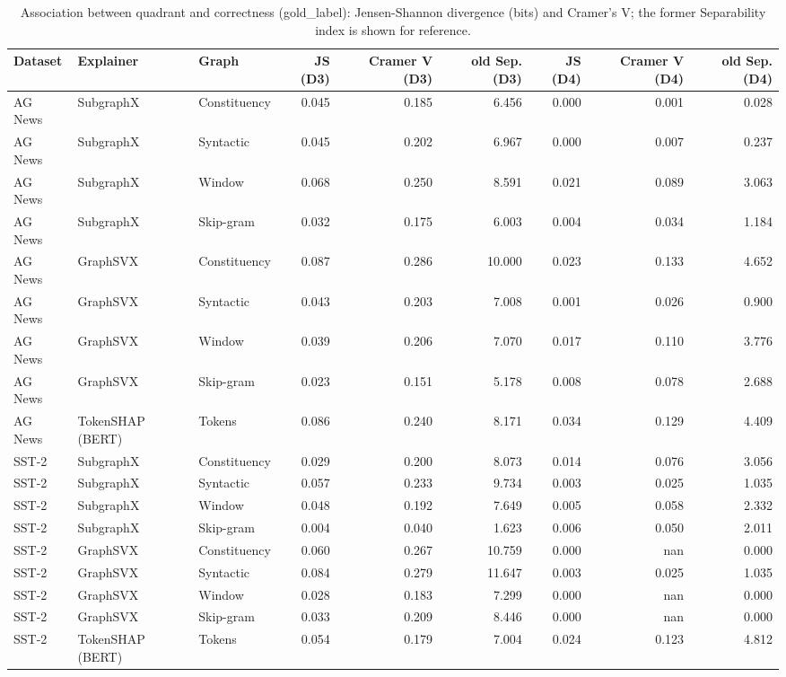 \begin{table}[H]
\centering
\small
\caption{Association between quadrant and correctness (gold_label): Jensen-Shannon divergence (bits) and Cramer's V; the former Separability index is shown for reference.}
\label{tab:quadrants_gold_label}
\begin{tabular}{lllrrrrrr}
\toprule
Dataset & Explainer & Graph & JS (D3) & Cramer V (D3) & old Sep. (D3) & JS (D4) & Cramer V (D4) & old Sep. (D4) \\
\midrule
AG News & SubgraphX & Constituency & 0.045 & 0.185 & 6.456 & 0.000 & 0.001 & 0.028 \\
AG News & SubgraphX & Syntactic & 0.045 & 0.202 & 6.967 & 0.000 & 0.007 & 0.237 \\
AG News & SubgraphX & Window & 0.068 & 0.250 & 8.591 & 0.021 & 0.089 & 3.063 \\
AG News & SubgraphX & Skip-gram & 0.032 & 0.175 & 6.003 & 0.004 & 0.034 & 1.184 \\
AG News & GraphSVX & Constituency & 0.087 & 0.286 & 10.000 & 0.023 & 0.133 & 4.652 \\
AG News & GraphSVX & Syntactic & 0.043 & 0.203 & 7.008 & 0.001 & 0.026 & 0.900 \\
AG News & GraphSVX & Window & 0.039 & 0.206 & 7.070 & 0.017 & 0.110 & 3.776 \\
AG News & GraphSVX & Skip-gram & 0.023 & 0.151 & 5.178 & 0.008 & 0.078 & 2.688 \\
AG News & TokenSHAP (BERT) & Tokens & 0.086 & 0.240 & 8.171 & 0.034 & 0.129 & 4.409 \\
SST-2 & SubgraphX & Constituency & 0.029 & 0.200 & 8.073 & 0.014 & 0.076 & 3.056 \\
SST-2 & SubgraphX & Syntactic & 0.057 & 0.233 & 9.734 & 0.003 & 0.025 & 1.035 \\
SST-2 & SubgraphX & Window & 0.048 & 0.192 & 7.649 & 0.005 & 0.058 & 2.332 \\
SST-2 & SubgraphX & Skip-gram & 0.004 & 0.040 & 1.623 & 0.006 & 0.050 & 2.011 \\
SST-2 & GraphSVX & Constituency & 0.060 & 0.267 & 10.759 & 0.000 & nan & 0.000 \\
SST-2 & GraphSVX & Syntactic & 0.084 & 0.279 & 11.647 & 0.003 & 0.025 & 1.035 \\
SST-2 & GraphSVX & Window & 0.028 & 0.183 & 7.299 & 0.000 & nan & 0.000 \\
SST-2 & GraphSVX & Skip-gram & 0.033 & 0.209 & 8.446 & 0.000 & nan & 0.000 \\
SST-2 & TokenSHAP (BERT) & Tokens & 0.054 & 0.179 & 7.004 & 0.024 & 0.123 & 4.812 \\
\bottomrule
\end{tabular}
\end{table}

